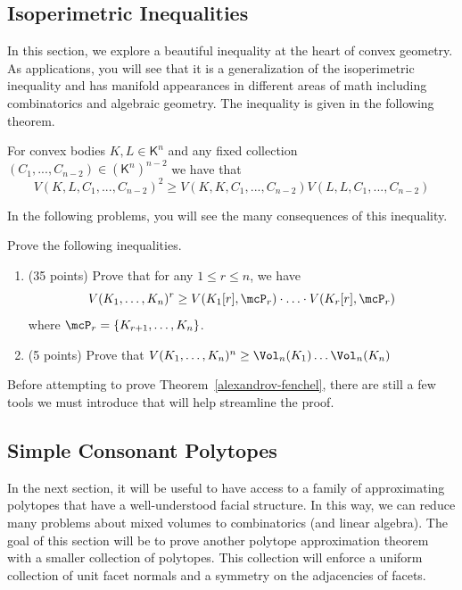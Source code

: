 \documentclass[11pt]{article}
\begin{document}
\subsection{Isoperimetric Inequalities}

In this section, we explore a beautiful inequality at the heart of convex geometry. As applications, you will see that it is a generalization of the isoperimetric inequality and has manifold appearances in different areas of math including combinatorics and algebraic geometry. The inequality is given in the following theorem. 

\begin{thm} \label{alexandrov-fenchel}
    For convex bodies $K, L \in \mathsf{K}^n$ and any fixed collection $(C_1, ..., C_{n-2}) \in (\mathsf{K}^n)^{n-2}$ we have that
    \[
        V(K, L, C_1, ..., C_{n-2})^2 \geq V(K, K, C_1, ..., C_{n-2}) V(L, L, C_1, ..., C_{n-2})
    \]
\end{thm}

In the following problems, you will see the many consequences of this inequality. 

\begin{prob} [40 points]
    Prove the following inequalities. 
    \begin{enumerate}[label = (\alph*)]
        \item (35 points) Prove that for any $1 \leq r \leq n$, we have 
        \[
            V(K_1, \ldots, K_n)^r \geq V(K_1[r], \mcP_r) \cdot \ldots \cdot V(K_r[r], \mcP_r)
        \]
        where $\mcP_r = \{K_{r+1}, \ldots, K_n\}$. 
        \item (5 points) Prove that $V(K_1, \ldots, K_n)^n \geq \Vol_n(K_1) \ldots \Vol_n(K_n)$
    \end{enumerate}
\end{prob}

Before attempting to prove Theorem~\ref{alexandrov-fenchel}, there are still a few tools we must introduce that will help streamline the proof.
\subsection{Simple Consonant Polytopes}

In the next section, it will be useful to have access to a family of approximating polytopes that have a well-understood facial structure. In this way, we can reduce many problems about mixed volumes to combinatorics (and linear algebra). The goal of this section will be to prove another polytope approximation theorem with a smaller collection of polytopes. This collection will enforce a uniform collection of unit facet normals and a symmetry on the adjacencies of facets. 
\end{document}
